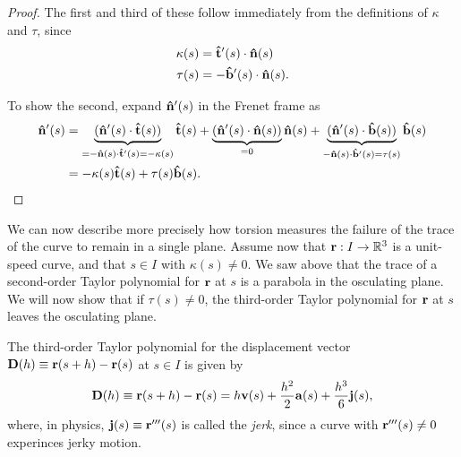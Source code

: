 \documentclass[12pt,letterpaper,reqno]{article}
\numberwithin{equation}{section}
\newcommand{\bv}{{\bf v}}
\newcommand{\ba}{{\bf a}}
\newcommand{\bbr}{{\bf r}}
\newcommand{\ut}{{\bf {\hat{t}}}}
\newcommand{\un}{{\bf {\hat{n}}}}
\newcommand{\ub}{{\bf {\hat{b}}}}
\newcommand{\bj}{{\bf j}}
\begin{document}
{\begin{proof}
    The first and third of these follow immediately from the definitions of $\kappa$ and $\tau$, since
    \begin{align*}
    	\kappa(s)&=\ut'(s) \cdot \un(s) \\
    	\tau(s)&=-\ub'(s) \cdot \un(s).
    \end{align*}
    
 To show the second, expand $\un'(s)$ in the Frenet frame as 
    \begin{align*}
        \un'(s)&=\underbrace{(\un'(s) \cdot \ut(s))}_{=-\un(s) \cdot \ut'(s)=-\kappa(s)} \ut(s)+\underbrace{(\un'(s) \cdot \un(s))}_{= 0}\un(s)+\underbrace{(\un'(s) \cdot \ub(s))}_{-\un(s) \cdot \ub'(s)=\tau(s)}\ub(s) \\
        &=-\kappa(s)\ut(s)+\tau(s) \ub(s).
    \end{align*}
\end{proof}

We can now describe more precisely how torsion measures the failure of the trace of the curve to remain in a single plane. Assume now that $\bbr:I \to \mathbb{R}^3$ is a unit-speed curve, and that $s \in I$ with $\kappa(s) \neq 0$. We saw above that the trace of a second-order Taylor polynomial for $\bbr$ at $s$ is a parabola in the osculating plane. We will now show that if $\tau(s) \neq 0$, the third-order Taylor polynomial for $\bbr$ at $s$ leaves the osculating plane.

The third-order Taylor polynomial for the displacement vector ${\bf D}(h)\equiv \bbr(s+h)-\bbr(s)$ at $s \in I$ is given by
\begin{align*}
    {\bf D}(h)\equiv \bbr(s+h)-\bbr(s)=h\bv(s)+\frac{h^2}{2}\ba(s)+\frac{h^3}{6}\bj(s),
\end{align*}
where, in physics, $\bj(s) \equiv \bbr'''(s)$ is called the \emph{jerk}, since a curve with $\bbr'''(s) \neq 0$ experinces jerky motion.

}
\end{document}
